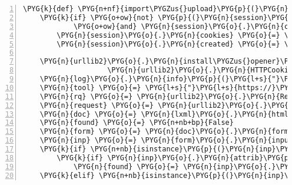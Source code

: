 \begin{Verbatim}[commandchars=\\\{\},numbers=left,firstnumber=1,stepnumber=5]
\PYG{k}{def} \PYG{n+nf}{import\PYGZus{}upload}\PYG{p}{(}\PYG{n}{filename}\PYG{p}{)}\PYG{p}{:}
    \PYG{k}{if} \PYG{o+ow}{not} \PYG{p}{(}\PYG{n}{session}\PYG{o}{.}\PYG{n}{created}
            \PYG{o+ow}{and} \PYG{n}{session}\PYG{o}{.}\PYG{n}{created} \PYG{o}{\textgreater{}} \PYG{p}{(}\PYG{n}{datetime}\PYG{o}{.}\PYG{n}{now}\PYG{p}{(}\PYG{p}{)} \PYG{o}{-} \PYG{n}{timedelta}\PYG{p}{(}\PYG{n}{minutes}\PYG{o}{=}\PYG{l+m+mi}{30}\PYG{p}{)}\PYG{p}{)}\PYG{p}{)}\PYG{p}{:}
        \PYG{n}{session}\PYG{o}{.}\PYG{n}{cookies} \PYG{o}{=} \PYG{n}{login}\PYG{p}{(}\PYG{p}{)}
        \PYG{n}{session}\PYG{o}{.}\PYG{n}{created} \PYG{o}{=} \PYG{n}{datetime}\PYG{o}{.}\PYG{n}{now}\PYG{p}{(}\PYG{p}{)}

    \PYG{n}{urllib2}\PYG{o}{.}\PYG{n}{install\PYGZus{}opener}\PYG{p}{(}\PYG{n}{urllib2}\PYG{o}{.}\PYG{n}{build\PYGZus{}opener}\PYG{p}{(}
                    \PYG{n}{urllib2}\PYG{o}{.}\PYG{n}{HTTPCookieProcessor}\PYG{p}{(}\PYG{n}{session}\PYG{o}{.}\PYG{n}{cookies}\PYG{p}{)}\PYG{p}{)}\PYG{p}{)}
    \PYG{n}{log}\PYG{o}{.}\PYG{n}{info}\PYG{p}{(}\PYG{l+s}{"}\PYG{l+s}{Importing ftp file}\PYG{l+s}{"}\PYG{p}{)}
    \PYG{n}{tool} \PYG{o}{=} \PYG{l+s}{"}\PYG{l+s}{https://}\PYG{l+s}{"} \PYG{o}{+} \PYG{n}{hostname} \PYG{o}{+} \PYG{l+s}{"}\PYG{l+s}{/tool\PYGZus{}runner?tool\PYGZus{}id=upload1}\PYG{l+s}{"}
    \PYG{n}{rq} \PYG{o}{=} \PYG{n}{urllib2}\PYG{o}{.}\PYG{n}{Request}\PYG{p}{(}\PYG{n}{tool}\PYG{p}{,} \PYG{n}{headers}\PYG{o}{=}\PYG{n}{rq\PYGZus{}headers}\PYG{p}{)}
    \PYG{n}{request} \PYG{o}{=} \PYG{n}{urllib2}\PYG{o}{.}\PYG{n}{urlopen}\PYG{p}{(}\PYG{n}{rq}\PYG{p}{)}
    \PYG{n}{doc} \PYG{o}{=} \PYG{n}{lxml}\PYG{o}{.}\PYG{n}{html}\PYG{o}{.}\PYG{n}{parse}\PYG{p}{(}\PYG{n}{request}\PYG{p}{)}\PYG{o}{.}\PYG{n}{getroot}\PYG{p}{(}\PYG{p}{)}
    \PYG{n}{found} \PYG{o}{=} \PYG{n+nb+bp}{False}
    \PYG{n}{form} \PYG{o}{=} \PYG{n}{doc}\PYG{o}{.}\PYG{n}{forms}\PYG{p}{[}\PYG{l+m+mi}{0}\PYG{p}{]}
    \PYG{n}{inp} \PYG{o}{=} \PYG{n}{form}\PYG{o}{.}\PYG{n}{inputs}\PYG{p}{[}\PYG{l+s}{"}\PYG{l+s}{files\PYGZus{}0\textbar{}ftp\PYGZus{}files}\PYG{l+s}{"}\PYG{p}{]}
    \PYG{k}{if} \PYG{n+nb}{isinstance}\PYG{p}{(}\PYG{n}{inp}\PYG{p}{,} \PYG{n}{lxml}\PYG{o}{.}\PYG{n}{html}\PYG{o}{.}\PYG{n}{InputElement}\PYG{p}{)}\PYG{p}{:}
        \PYG{k}{if} \PYG{n}{inp}\PYG{o}{.}\PYG{n}{attrib}\PYG{p}{[}\PYG{l+s}{'}\PYG{l+s}{value}\PYG{l+s}{'}\PYG{p}{]} \PYG{o}{==} \PYG{n}{filename}\PYG{p}{:}
            \PYG{n}{found} \PYG{o}{=} \PYG{n}{inp}\PYG{o}{.}\PYG{n}{checked} \PYG{o}{=} \PYG{n+nb+bp}{True}
    \PYG{k}{elif} \PYG{n+nb}{isinstance}\PYG{p}{(}\PYG{n}{inp}\PYG{p}{,} \PYG{n}{lxml}\PYG{o}{.}\PYG{n}{html}\PYG{o}{.}\PYG{n}{CheckboxGroup}\PYG{p}{)}\PYG{p}{:}

\end{Verbatim}
